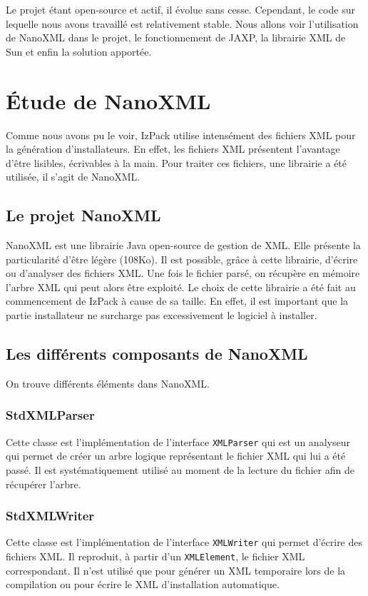 Le projet étant open-source et actif, il évolue sans cesse. Cependant, le code sur lequelle nous avons travaillé est relativement stable. Nous allons voir l'utilisation de NanoXML dans le projet, le fonctionnement de JAXP, la librairie XML de Sun et enfin la solution apportée.

\section{Étude de NanoXML}
Comme nous avons pu le voir, IzPack utilise intensément des fichiers XML pour la génération d'installateurs.
En effet, les fichiers XML présentent l'avantage d'être lisibles, écrivables à la main.
Pour traiter ces fichiers, une librairie a été utilisée, il s'agit de NanoXML.
\subsection{Le projet NanoXML}
NanoXML est une librairie Java open-source de gestion de XML.
Elle présente la particularité d'être légère (108Ko).
Il est possible, grâce à cette librairie, d'écrire ou d'analyser des fichiers XML.
Une fois le fichier parsé, on récupère en mémoire l'arbre XML qui peut alors être exploité.
Le choix de cette librairie a été fait au commencement de IzPack à cause de sa taille.
En effet, il est important que la partie installateur ne surcharge pas excessivement le logiciel à installer.
\subsection{Les différents composants de NanoXML}
On trouve différents éléments dans NanoXML.
\subsubsection{StdXMLParser}
Cette classe est l'implémentation de l'interface \verb|XMLParser| qui est un analyseur qui permet de créer un arbre logique représentant le fichier XML qui lui a été passé.
Il est systématiquement utilisé au moment de la lecture du fichier afin de récupérer l'arbre.
\subsubsection{StdXMLWriter}
Cette classe est l'implémentation de l'interface \verb|XMLWriter| qui permet d'écrire des fichiers XML.
Il reproduit, à partir d'un \verb|XMLElement|, le fichier XML correspondant.
Il n'est utilisé que pour générer un XML temporaire lors de la compilation ou pour écrire le XML d'installation automatique.

